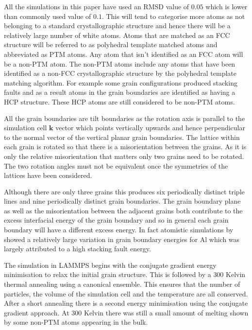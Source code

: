 \documentclass[12pt,a4paper,openany]{report}
\begin{document}
All the simulations in this paper have used an RMSD value of $0.05$ which is lower than commonly used value of $0.1$. This will tend to categorise more atoms as not belonging to a standard crystallographic structure and hence there will be a relatively large number of white atoms. Atoms that are matched as an FCC structure will be referred to as polyhedral template matched atoms and abbreviated as PTM atoms. Any atom that isn't identified as an FCC atom will be a non-PTM atom. The non-PTM atoms include any atoms that have been identified as a non-FCC crystallographic structure by the polyhedral template matching algorithm. For example some grain configurations produced stacking faults and as a result atoms in the grain boundaries are identified as having a HCP structure. These HCP atoms are still considered to be non-PTM atoms.
 
All the grain boundaries are tilt boundaries as the rotation axis is parallel to the simulation cell $\mathbf{k}$ vector which points vertically upwards and hence perpendicular to the normal vector of the vertical planar grain boundaries. The lattice within each grain is rotated so that there is a misorientation between the grains. As it is only the relative misorientation that matters only two grains need to be rotated. The two rotation angles must not be equivalent once the symmetries of the lattices have been considered. 

Although there are only three grains this produces six periodically distinct triple lines and nine periodically distinct grain boundaries. The grain boundary plane as well as the misorientation between the adjacent grains both contribute to the excess interfacial energy of the grain boundary and so in general each grain boundary will have a different excess energy. In fact atomistic simulations by \cite{HOLM2010905} showed a relatively large variation in grain boundary energies for Al which was largely attributed to a high stacking fault energy. 

The simulation in LAMMPS begins with the conjugate gradient energy minimisation to relax the initial grain structure. This is followed by a $300$ Kelvin thermal annealing using a canonical ensemble. This ensures that the number of particles, the volume of the simulation cell and the temperature are all conserved. After a short annealing there is a second energy minimisation using the conjugate gradient approach. At $300$ Kelvin there was still a small amount of melting shown by some non-PTM atoms appearing in the bulk. 
\end{document}
